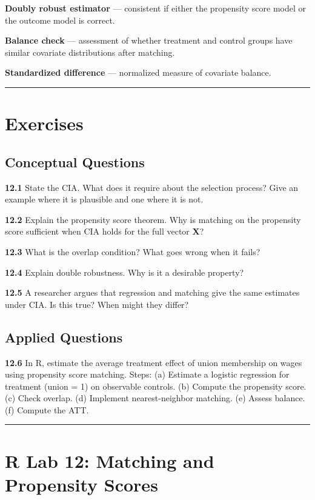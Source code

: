 \textbf{Doubly robust estimator} --- consistent if either the propensity score model or the outcome model is correct.

\textbf{Balance check} --- assessment of whether treatment and control groups have similar covariate distributions after matching.

\textbf{Standardized difference} --- normalized measure of covariate balance.

\medskip\hrule\medskip

\section{Exercises}

\subsection{Conceptual Questions}

\textbf{12.1} State the CIA. What does it require about the selection process? Give an example where it is plausible and one where it is not.

\textbf{12.2} Explain the propensity score theorem. Why is matching on the propensity score sufficient when CIA holds for the full vector $\mathbf{X}$?

\textbf{12.3} What is the overlap condition? What goes wrong when it fails?

\textbf{12.4} Explain double robustness. Why is it a desirable property?

\textbf{12.5} A researcher argues that regression and matching give the same estimates under CIA. Is this true? When might they differ?

\subsection{Applied Questions}

\textbf{12.6} In R, estimate the average treatment effect of union membership on wages using propensity score matching. Steps:
(a) Estimate a logistic regression for treatment (union = 1) on observable controls.
(b) Compute the propensity score.
(c) Check overlap.
(d) Implement nearest-neighbor matching.
(e) Assess balance.
(f) Compute the ATT.

\medskip\hrule\medskip

\section{R Lab 12: Matching and Propensity Scores}

